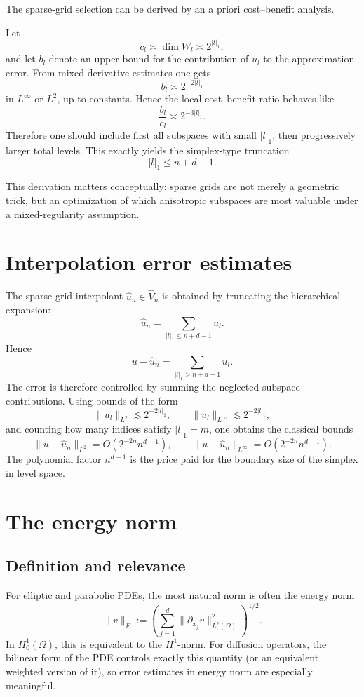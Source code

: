 \documentclass[11pt,a4paper]{report}
\begin{document}
The sparse-grid selection can be derived by an a priori cost--benefit analysis.

Let
$$
c_l \asymp \dim W_l \asymp 2^{|l|_1},
$$
and let $b_l$ denote an upper bound for the contribution of $u_l$ to the approximation error. From mixed-derivative estimates one gets
$$
b_l \asymp 2^{-2|l|_1}
$$
in $L^\infty$ or $L^2$, up to constants. Hence the local cost--benefit ratio behaves like
$$
\frac{b_l}{c_l} \asymp 2^{-3|l|_1}.
$$
Therefore one should include first all subspaces with small $|l|_1$, then progressively larger total levels. This exactly yields the simplex-type truncation
$$
|l|_1 \le n+d-1.
$$

This derivation matters conceptually: sparse grids are not merely a geometric trick, but an optimization of which anisotropic subspaces are most valuable under a mixed-regularity assumption.

\section{Interpolation error estimates}

The sparse-grid interpolant $\widehat u_n\in \widehat V_n$ is obtained by truncating the hierarchical expansion:
$$
\widehat u_n
=
\sum_{|l|_1\le n+d-1} u_l.
$$
Hence
$$
u-\widehat u_n
=
\sum_{|l|_1>n+d-1} u_l.
$$
The error is therefore controlled by summing the neglected subspace contributions. Using bounds of the form
$$
\|u_l\|_{L^2} \lesssim 2^{-2|l|_1},
\qquad
\|u_l\|_{L^\infty} \lesssim 2^{-2|l|_1},
$$
and counting how many indices satisfy $|l|_1=m$, one obtains the classical bounds
$$
\|u-\widehat u_n\|_{L^2}
=
O(2^{-2n} n^{d-1}),
\qquad
\|u-\widehat u_n\|_{L^\infty}
=
O(2^{-2n} n^{d-1}).
$$
The polynomial factor $n^{d-1}$ is the price paid for the boundary size of the simplex in level space.

\section{The energy norm}

\subsection{Definition and relevance}

For elliptic and parabolic PDEs, the most natural norm is often the energy norm
$$
\|v\|_E
:=
\left(
\sum_{j=1}^d \|\partial_{x_j} v\|_{L^2(\Omega)}^2
\right)^{1/2}.
$$
In $H_0^1(\Omega)$, this is equivalent to the $H^1$-norm. For diffusion operators, the bilinear form of the PDE controls exactly this quantity (or an equivalent weighted version of it), so error estimates in energy norm are especially meaningful.
\end{document}
